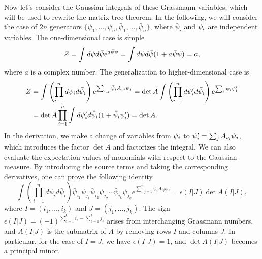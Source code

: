 Now let's consider the Gaussian integrals of these Grassmann variables, which will be used to rewrite the
matrix tree theorem. In the following, we will consider the case of $2n$ generators $\{\psi_1, \dots, \psi_n, \bar{\psi}_1, \dots, \bar{\psi}_n\}$, where $\bar{\psi}_i$ 
and ${\psi}_i$ are independent variables. The one-dimensional case is simple
\begin{equation}
    Z = \int d{\psi} d\bar{{\psi}}  e^{a\bar{{\psi}} {\psi}} = \int d{\psi} d\bar{{\psi}}(1+a\bar{{\psi}}{\psi}) = a,
\end{equation}
where $a$ is a complex number. The generalization to higher-dimensional case is
\begin{equation}
\begin{aligned}
    Z &= \int \left(\prod_{i=1}^n d{\psi}_i d\bar{{\psi}}_i\right)  e^{\sum_{i,j}\bar{{\psi}}_i A_{ij} {\psi}_j} = \operatorname{det}A \int \left(\prod_{i=1}^n d{\psi}_i^\prime d\bar{{\psi}}_i\right) 
    e^{\sum_i \bar{{\psi}}_i{\psi}_i^\prime}\\ 
    &= \operatorname{det}A \prod_{i=1}^n \int d{\psi}_i^\prime d\bar{{\psi}}_i(1+\bar{{\psi}}_i{\psi}^\prime_i) = \operatorname{det}A.
\end{aligned}
\end{equation}
In the derivation, we make a change of variables from ${\psi}_i$ to ${\psi}_i^\prime = \sum_j A_{ij} {\psi}_j$, which introduces
the factor $\operatorname{det}A$ and factorizes the integral. We can also evaluate the expectation values of monomials with
respect to the Gaussian measure. By introducing the source terms and taking the corresponding derivatives,
one can prove the following identity
\begin{equation}\label{eq:Wick}
	\int \left(\prod_{i=1}^{n} d\psi_i d\bar{\psi}_i\right) \bar{\psi}_{i_{1}} \psi_{j_{1}} \bar{\psi}_{i_{2}} \psi_{j_{2}} \cdots \bar{\psi}_{i_{k}} \psi_{j_{k}} 
	e^{\sum_{i, j=1}^{n} \bar{\psi}_{i} A_{i j} \psi_{j}}=\epsilon(I|J) \operatorname{det} A(I|J),
\end{equation}
where $I = (i_1, \dots, i_k)$ and $J = (j_1, \dots, j_k)$. The sign $\epsilon(I|J) = (-1)^{\sum_{s=1}^k i_s - \sum_{s=1}^k j_s}$ arises from interchanging
Grassmann numbers, and $A(I|J)$ is the submatrix of $A$ by removing rows $I$ and columns $J$. In particular, for the case of $I = J$, we have $\epsilon(I|J) = 1$,
and $\operatorname{det} A(I|J)$ becomes a principal minor.




